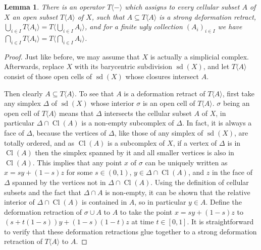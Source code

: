 \documentclass[a4paper,11pt,reqno, english]{amsart}
\newtheorem{lemma}[theorem]{Lemma}
\theoremstyle{definition}
\theoremstyle{remark}
\begin{document}
\begin{lemma}\label{lem:operator-T}
    There is an operator $T\langle-\rangle$ which assigns to every cellular subset $A$ of $X$ an open subset $T\langle A\rangle$ of $X$, such that $A\subseteq T\langle A\rangle$ is a strong deformation retract, $\bigcup_{i\in I}T\langle A_i\rangle=T\langle\bigcup_{i\in I}A_i\rangle$, and for a finite ugly collection $(A_i)_{i\in I}$ we have $\bigcap_{i\in I}T\langle A_i\rangle=T\langle\bigcap_{i\in I}A_i\rangle$.
\end{lemma}
\begin{proof}
    Just like before, we may assume that $X$ is actually a simplicial complex. 
    Afterwards, replace $X$ with its barycentric subdivision $\operatorname{sd}(X)$, and let $T\langle A\rangle$ consist of those open cells of $\operatorname{sd}(X)$ whose closures intersect $A$.

    Then clearly $A\subseteq T\langle A\rangle$. To see that $A$ is a deformation retract of $T\langle A\rangle$, first take any simplex $\Delta$ of $\operatorname{sd}(X)$ whose interior $\sigma$ is an open cell of $T\langle A\rangle$. $\sigma$ being an open cell of $T\langle A\rangle$ means that $\Delta$ intersects the cellular subset $A$ of $X$, in particular  $\Delta\cap \operatorname{Cl}(A)$ is a non-empty subcomplex of $\Delta$. In fact, it is always a face of $\Delta$, because the vertices of $\Delta$, like those of any simplex of $\operatorname{sd}(X)$, are totally ordered, and as $\operatorname{Cl}(A)$ is a subcomplex of $X$, if a vertex of $\Delta$ is in $\operatorname{Cl}(A)$ then the simplex spanned by it and all smaller vertices is also in $\operatorname{Cl}(A)$. This implies that any point $x$ of $\sigma$ can be uniquely written as $x=sy+(1-s)z$ for some $s\in(0,1)$, $y\in\Delta\cap\operatorname{Cl}(A)$, and $z$ in the face of $\Delta$ spanned by the vertices not in $\Delta\cap\operatorname{Cl}(A)$. Using the definition of cellular subsets and the fact that $\Delta\cap A$ is non-empty, it can be shown that the relative interior of $\Delta\cap\operatorname{Cl}(A)$ is contained in $A$, so in particular $y\in A$. Define the deformation retraction of $\sigma\cup A$ to $A$ to take the point $x=sy+(1-s)z$ to $(s+t(1-s))y+(1-s)(1-t)z$ at time $t\in[0,1]$. It is straightforward to verify that these deformation retractions glue together to a strong deformation retraction of $T\langle A\rangle$ to $A$. 


\end{proof}
\end{document}
